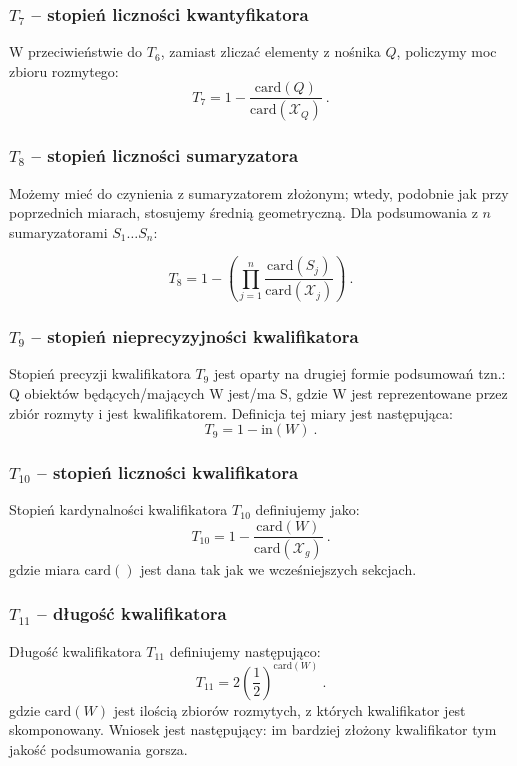 \documentclass{classrep}
\newcommand{\card}{\mathrm{card}}
\begin{document}
\subsubsection{\(T_7\) -- stopień liczności kwantyfikatora}
W przeciwieństwie do \(T_6\), zamiast zliczać elementy z nośnika \(Q\),
policzymy moc zbioru rozmytego:
\[T_7 = 1-\frac{\card(Q)}{\card(\mathcal{X}_Q)} ~\mbox{.}\]

\subsubsection{\(T_8\) -- stopień liczności sumaryzatora}
Możemy mieć do czynienia z sumaryzatorem złożonym; wtedy,
podobnie jak przy poprzednich miarach, stosujemy średnią geometryczną.
Dla podsumowania z \(n\) sumaryzatorami \(S_1 \ldots S_n\):

\[T_8 = 1- \left(\prod_{j=1}^{n} \frac{\card(S_j)}{\card(\mathcal{X}_j)}\right) ~\mbox{.}\]

\subsubsection{\(T_9\) -- stopień nieprecyzyjności kwalifikatora}
Stopień precyzji kwalifikatora \(T_9\) jest oparty na drugiej formie podsumowań tzn.: Q obiektów będących/mających W jest/ma S, gdzie W jest reprezentowane przez zbiór rozmyty i jest kwalifikatorem. Definicja tej miary jest następująca:
\[T_9 = 1-\mathrm{in}(W) ~\mbox{.}\]

\subsubsection{\(T_{10}\) -- stopień liczności kwalifikatora}
Stopień kardynalności kwalifikatora \(T_{10}\) definiujemy jako:
\[T_{10} = 1-\frac{\card(W)}{\card(\mathcal{X}_g)} ~\mbox{.}\]
gdzie miara $\card()$ jest dana tak jak we wcześniejszych sekcjach.


\subsubsection{\(T_{11}\) -- długość kwalifikatora}
Długość kwalifikatora \(T_{11}\) definiujemy następująco:
\[T_{11} = 2\left(\frac{1}{2}\right)^{\card({W})} ~\mbox{.}\]
gdzie $\card(W)$ jest ilością zbiorów rozmytych, z których kwalifikator jest skomponowany. Wniosek jest następujący: im bardziej złożony kwalifikator tym jakość podsumowania gorsza.
\end{document}
